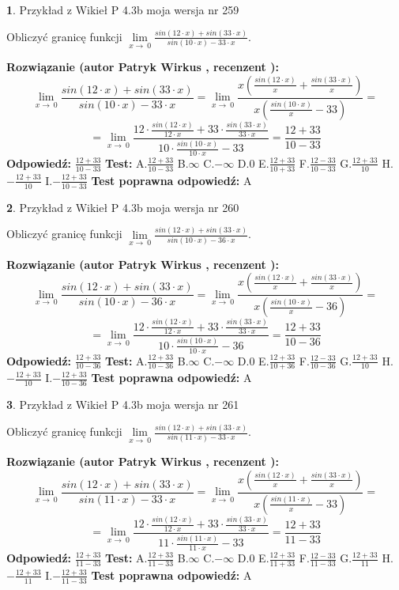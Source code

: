 \documentclass[12pt, a4paper]{article}
\theoremstyle{definition} %
\newtheorem{zad}{}
\newcommand{\zadStart}[1]{\begin{zad}#1\newline}
\newcommand{\zadStop}{\end{zad}}
\newcommand{\rozwStart}[2]{\noindent \textbf{Rozwiązanie (autor #1 , recenzent #2): }\newline}
\newcommand{\rozwStop}{\newline}
\newcommand{\odpStart}{\noindent \textbf{Odpowiedź:}\newline}
\newcommand{\odpStop}{\newline}
\newcommand{\testStart}{\noindent \textbf{Test:}\newline}
\newcommand{\testStop}{\newline}
\newcommand{\kluczStart}{\noindent \textbf{Test poprawna odpowiedź:}\newline}
\newcommand{\kluczStop}{\newline}
\begin{document}
\zadStart{Przykład z Wikieł P 4.3b moja wersja nr 259}


Obliczyć granicę funkcji $\lim\limits_{x\to\ 0}\frac{sin(12 \cdot x)+sin(33 \cdot x)}{sin(10 \cdot x)-33 \cdot x}$.
\zadStop
\rozwStart{Patryk Wirkus}{}
$$\lim\limits_{x\to\ 0}\frac{sin(12 \cdot x)+sin(33 \cdot x)}{sin(10 \cdot x)-33 \cdot x}=\lim\limits_{x\to\ 0}\frac{x(\frac{sin(12 \cdot x)}{x}+\frac{sin(33 \cdot x)}{x})}{x(\frac{sin(10 \cdot x)}{x}-33)}=$$
$$=\lim\limits_{x\to\ 0}\frac{12 \cdot \frac{sin(12 \cdot x)}{12 \cdot x}+33 \cdot \frac{sin(33 \cdot x)}{33 \cdot x}}{10 \cdot \frac{sin(10 \cdot x)}{10 \cdot x}-33}=\frac{12+33}{10-33}$$
\rozwStop
\odpStart
$\frac{12+33}{10-33}$
\odpStop
\testStart
A.$\frac{12+33}{10-33}$
B.$\infty$
C.$-\infty$
D.$0$
E.$\frac{12+33}{10+33}$
F.$\frac{12-33}{10-33}$
G.$\frac{12+33}{10}$
H.$-\frac{12+33}{10}$
I.$-\frac{12+33}{10-33}$
\testStop
\kluczStart
A
\kluczStop



\zadStart{Przykład z Wikieł P 4.3b moja wersja nr 260}


Obliczyć granicę funkcji $\lim\limits_{x\to\ 0}\frac{sin(12 \cdot x)+sin(33 \cdot x)}{sin(10 \cdot x)-36 \cdot x}$.
\zadStop
\rozwStart{Patryk Wirkus}{}
$$\lim\limits_{x\to\ 0}\frac{sin(12 \cdot x)+sin(33 \cdot x)}{sin(10 \cdot x)-36 \cdot x}=\lim\limits_{x\to\ 0}\frac{x(\frac{sin(12 \cdot x)}{x}+\frac{sin(33 \cdot x)}{x})}{x(\frac{sin(10 \cdot x)}{x}-36)}=$$
$$=\lim\limits_{x\to\ 0}\frac{12 \cdot \frac{sin(12 \cdot x)}{12 \cdot x}+33 \cdot \frac{sin(33 \cdot x)}{33 \cdot x}}{10 \cdot \frac{sin(10 \cdot x)}{10 \cdot x}-36}=\frac{12+33}{10-36}$$
\rozwStop
\odpStart
$\frac{12+33}{10-36}$
\odpStop
\testStart
A.$\frac{12+33}{10-36}$
B.$\infty$
C.$-\infty$
D.$0$
E.$\frac{12+33}{10+36}$
F.$\frac{12-33}{10-36}$
G.$\frac{12+33}{10}$
H.$-\frac{12+33}{10}$
I.$-\frac{12+33}{10-36}$
\testStop
\kluczStart
A
\kluczStop



\zadStart{Przykład z Wikieł P 4.3b moja wersja nr 261}


Obliczyć granicę funkcji $\lim\limits_{x\to\ 0}\frac{sin(12 \cdot x)+sin(33 \cdot x)}{sin(11 \cdot x)-33 \cdot x}$.
\zadStop
\rozwStart{Patryk Wirkus}{}
$$\lim\limits_{x\to\ 0}\frac{sin(12 \cdot x)+sin(33 \cdot x)}{sin(11 \cdot x)-33 \cdot x}=\lim\limits_{x\to\ 0}\frac{x(\frac{sin(12 \cdot x)}{x}+\frac{sin(33 \cdot x)}{x})}{x(\frac{sin(11 \cdot x)}{x}-33)}=$$
$$=\lim\limits_{x\to\ 0}\frac{12 \cdot \frac{sin(12 \cdot x)}{12 \cdot x}+33 \cdot \frac{sin(33 \cdot x)}{33 \cdot x}}{11 \cdot \frac{sin(11 \cdot x)}{11 \cdot x}-33}=\frac{12+33}{11-33}$$
\rozwStop
\odpStart
$\frac{12+33}{11-33}$
\odpStop
\testStart
A.$\frac{12+33}{11-33}$
B.$\infty$
C.$-\infty$
D.$0$
E.$\frac{12+33}{11+33}$
F.$\frac{12-33}{11-33}$
G.$\frac{12+33}{11}$
H.$-\frac{12+33}{11}$
I.$-\frac{12+33}{11-33}$
\testStop
\kluczStart
A
\kluczStop
\end{document}
